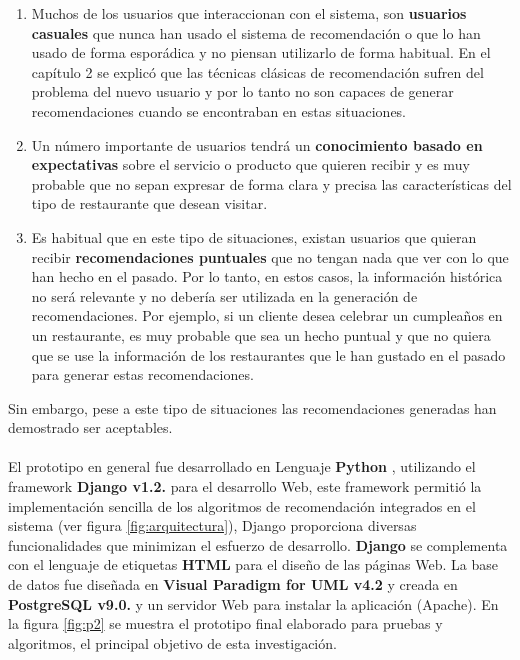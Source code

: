 \documentclass[12pt,letterpaper,oneside] {memoir}
\begin{document}
\begin{enumerate}
\item Muchos de los usuarios que interaccionan con el sistema, son \textbf{usuarios casuales} que nunca han usado el sistema de recomendación o que lo han usado de forma esporádica y no piensan utilizarlo de forma habitual. En el capítulo 2  se explicó que las técnicas clásicas de recomendación sufren del problema del nuevo usuario y por lo tanto no son capaces de generar recomendaciones cuando se encontraban en estas situaciones.
\item Un número importante de usuarios tendrá un \textbf{conocimiento basado en expectativas} sobre el servicio o producto que quieren recibir y es muy probable que no sepan expresar de forma clara y precisa las características del tipo de restaurante que desean visitar.
\item Es habitual que en este tipo de situaciones, existan usuarios que quieran recibir \textbf{recomendaciones puntuales} que no tengan nada que ver con lo que han hecho en el pasado. Por lo tanto, en estos casos, la información histórica no será relevante y no debería ser utilizada en la generación de recomendaciones. Por ejemplo, si un cliente desea celebrar un cumpleaños en un restaurante, es muy probable que sea un hecho puntual y que no quiera que se use la información de los restaurantes que le han gustado en el pasado para generar estas recomendaciones.
\end{enumerate}
Sin embargo, pese a este tipo de situaciones las recomendaciones generadas han demostrado ser aceptables.
\paragraph*{}
El prototipo en general fue desarrollado en Lenguaje \textbf{Python} \citep{Drake2000}, utilizando el framework \textbf{Django v1.2.} \citep{Django2008} para el desarrollo Web,  este framework permitió la implementación  sencilla de los algoritmos de recomendación integrados en el sistema (ver figura \ref{fig:arquitectura}), Django proporciona diversas funcionalidades que minimizan el esfuerzo de desarrollo. \textbf{Django} se complementa con el lenguaje de etiquetas \textbf{HTML} para el diseño de las páginas Web. 
La base de datos fue diseñada en \textbf{Visual Paradigm for UML v4.2} y creada en \textbf{PostgreSQL v9.0.} y un servidor Web para instalar la aplicación (Apache). 
En la  figura \ref{fig:p2} se muestra el prototipo final elaborado para pruebas y algoritmos, el principal objetivo de esta investigación.
\end{document}
